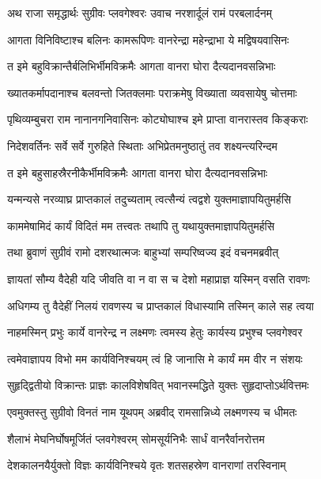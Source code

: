 
\twolineshloka
{अथ राजा समृद्धार्थः सुग्रीवः प्लवगेश्वरः}
{उवाच नरशार्दूलं रामं परबलार्दनम्} %

\twolineshloka
{आगता विनिविष्टाश्च बलिनः कामरूपिणः}
{वानरेन्द्रा महेन्द्राभा ये मद्विषयवासिनः} %

\twolineshloka
{त इमे बहुविक्रान्तैर्बलिभिर्भीमविक्रमैः}
{आगता वानरा घोरा दैत्यदानवसन्निभाः} %

\twolineshloka
{ख्यातकर्मापदानाश्च बलवन्तो जितक्लमाः}
{पराक्रमेषु विख्याता व्यवसायेषु चोत्तमाः} %

\twolineshloka
{पृथिव्यम्बुचरा राम नानानगनिवासिनः}
{कोट्योघाश्च इमे प्राप्ता वानरास्तव किङ्कराः} %

\twolineshloka
{निदेशवर्तिनः सर्वे सर्वे गुरुहिते स्थिताः}
{अभिप्रेतमनुष्ठातुं तव शक्ष्यन्त्यरिन्दम} %

\twolineshloka
{त इमे बहुसाहस्रैरनीकैर्भीमविक्रमैः}
{आगता वानरा घोरा दैत्यदानवसन्निभाः} %

\twolineshloka
{यन्मन्यसे नरव्याघ्र प्राप्तकालं तदुच्यताम्}
{त्वत्सैन्यं त्वद्वशे युक्तमाज्ञापयितुमर्हसि} %

\twolineshloka
{काममेषामिदं कार्यं विदितं मम तत्त्वतः}
{तथापि तु यथायुक्तमाज्ञापयितुमर्हसि} %

\twolineshloka
{तथा ब्रुवाणं सुग्रीवं रामो दशरथात्मजः}
{बाहुभ्यां सम्परिष्वज्य इदं वचनमब्रवीत्} %

\twolineshloka
{ज्ञायतां सौम्य वैदेही यदि जीवति वा न वा}
{स च देशो महाप्राज्ञ यस्मिन् वसति रावणः} %

\twolineshloka
{अधिगम्य तु वैदेहीं निलयं रावणस्य च}
{प्राप्तकालं विधास्यामि तस्मिन् काले सह त्वया} %

\twolineshloka
{नाहमस्मिन् प्रभुः कार्ये वानरेन्द्र न लक्ष्मणः}
{त्वमस्य हेतुः कार्यस्य प्रभुश्च प्लवगेश्वर} %

\twolineshloka
{त्वमेवाज्ञापय विभो मम कार्यविनिश्चयम्}
{त्वं हि जानासि मे कार्यं मम वीर न संशयः} %

\twolineshloka
{सुहृद्द्वितीयो विक्रान्तः प्राज्ञः कालविशेषवित्}
{भवानस्मद्धिते युक्तः सुहृदाप्तोऽर्थवित्तमः} %

\twolineshloka
{एवमुक्तस्तु सुग्रीवो विनतं नाम यूथपम्}
{अब्रवीद् रामसान्निध्ये लक्ष्मणस्य च धीमतः} %

\twolineshloka
{शैलाभं मेघनिर्घोषमूर्जितं प्लवगेश्वरम्}
{सोमसूर्यनिभैः सार्धं वानरैर्वानरोत्तम} %

\twolineshloka
{देशकालनयैर्युक्तो विज्ञः कार्यविनिश्चये}
{वृतः शतसहस्रेण वानराणां तरस्विनाम्} %

